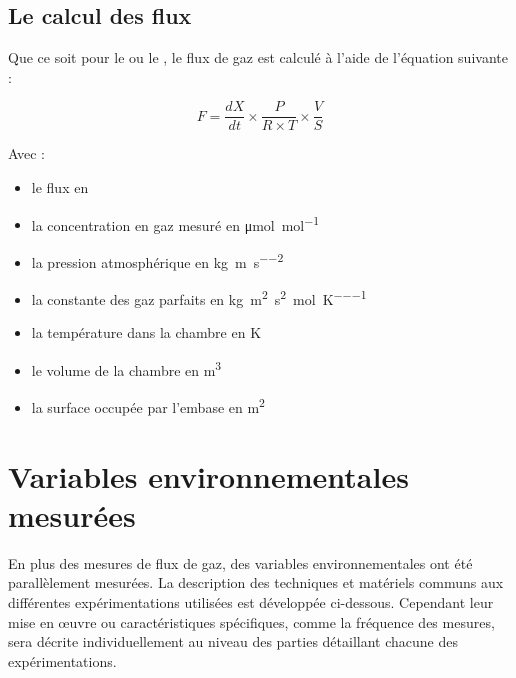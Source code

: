 \subsection{Le calcul des flux}

Que ce soit pour le \coo ou le \chh, le flux de gaz est calculé à l'aide de l'équation suivante : 

\begin{equation}
F = \frac{dX}{dt} \times \frac{P}{R \times T} \times \frac{V}{S}
\end{equation}

Avec : 
\begin{itemize}
\item[F :] le flux en \si{\uml}
\item[X :] la concentration en gaz mesuré en \si{\micro\mole\per\mole}
\item[P :] la pression atmosphérique en \si{\kilo\gram\per\metre\per\square\second}
\item[R :] la constante des gaz parfaits en \si{\kilo\gram\square\metre\per\square\second\per\mole\per\kelvin}
\item[T :] la température dans la chambre en \si{\kelvin}
\item[V :] le volume de la chambre en \si{\cubic\metre}
\item[S :] la surface occupée par l'embase en \si{\square\metre}
\end{itemize}

%
%


\section{Variables environnementales mesurées}
En plus des mesures de flux de gaz, des variables environnementales ont été parallèlement mesurées.
La description des techniques et matériels communs aux différentes expérimentations utilisées est développée ci-dessous.
Cependant leur mise en œuvre ou caractéristiques spécifiques, comme la fréquence des mesures, sera décrite individuellement au niveau des parties détaillant chacune des expérimentations.

